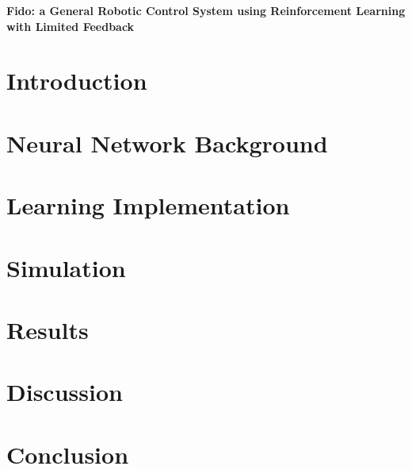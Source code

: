 \documentclass[letterpaper,12pt]{article}
\begin{document}
\begin{titlepage}
	\begin{center}
		{\Large \textbf{Fido: a General Robotic Control System using Reinforcement Learning with Limited Feedback}}\\
		\vspace{1.5cm}
	\end{center}
	
\end{titlepage}

\pagebreak

\section{Introduction}



\section{Neural Network Background}



\section{Learning Implementation}



\section{Simulation}



\section{Results}



\section{Discussion}



\section{Conclusion}



\nocite{wirefit,qlearn,backprop,practical,tutorial,kinematics}

\pagebreak


\end{document}
